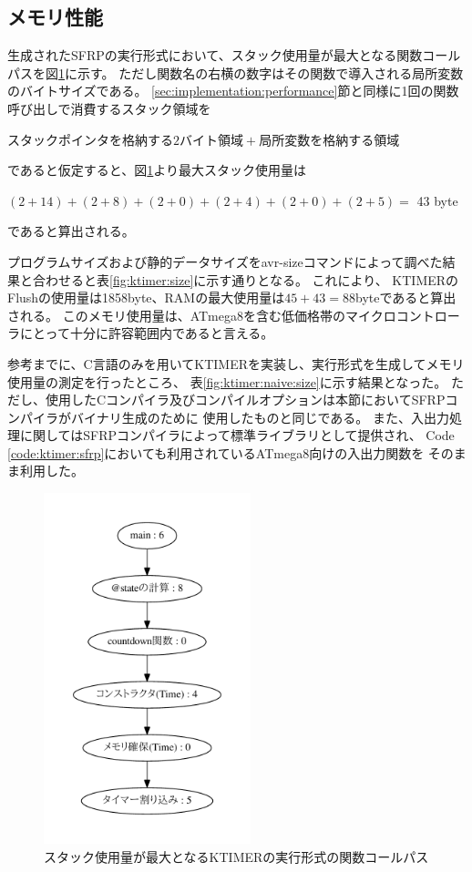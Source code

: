 \subsection{メモリ性能}
生成されたSFRPの実行形式において、スタック使用量が最大となる関数コールパスを図\ref{fig:ktimer:call_graph}に示す。
ただし関数名の右横の数字はその関数で導入される局所変数のバイトサイズである。
\ref{sec:implementation:performance}節と同様に1回の関数呼び出しで消費するスタック領域を
\begin{center}
$スタックポインタを格納する2バイト領域 + 局所変数を格納する領域$
\end{center}
であると仮定すると、図\ref{fig:ktimer:call_graph}より最大スタック使用量は
\begin{center}
$(2 + 14) + (2 + 8) + (2 + 0) + (2 + 4) + (2 + 0) + (2 + 5) =$ 43 byte\\
\end{center}
であると算出される。


プログラムサイズおよび静的データサイズをavr-sizeコマンドによって調べた結果と合わせると表\ref{fig:ktimer:size}に示す通りとなる。
これにより、 KTIMERのFlushの使用量は1858byte、RAMの最大使用量は$45+43=$88byteであると算出される。
このメモリ使用量は、ATmega8を含む低価格帯のマイクロコントローラにとって十分に許容範囲内であると言える。

参考までに、C言語のみを用いてKTIMERを実装し、実行形式を生成してメモリ使用量の測定を行ったところ、
表\ref{fig:ktimer:naive:size}に示す結果となった。
ただし、使用したCコンパイラ及びコンパイルオプションは本節においてSFRPコンパイラがバイナリ生成のために
使用したものと同じである。
また、入出力処理に関してはSFRPコンパイラによって標準ライブラリとして提供され、
Code \ref{code:ktimer:sfrp}においても利用されているATmega8向けの入出力関数を
そのまま利用した。

\begin{figure}[h]
 \begin{center}
  \includegraphics[width=60mm]{figure/call_graph_ktimer.pdf}
 \end{center}
 \caption{スタック使用量が最大となるKTIMERの実行形式の関数コールパス}
 \label{fig:ktimer:call_graph}
\end{figure}

